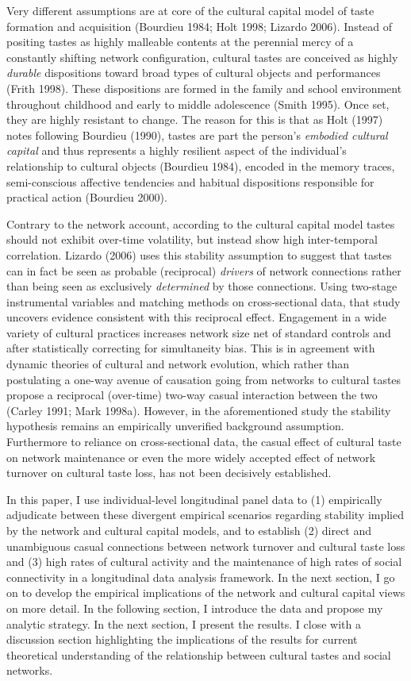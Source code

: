 \documentclass[
]{article}
\begin{document}
Very different assumptions are at core of the cultural capital model of taste formation and acquisition (Bourdieu 1984; Holt 1998; Lizardo 2006). Instead of positing tastes as highly malleable contents at the perennial mercy of a constantly shifting network configuration, cultural tastes are conceived as highly \emph{durable} dispositions toward broad types of cultural objects and performances (Frith 1998). These dispositions are formed in the family and school environment throughout childhood and early to middle adolescence (Smith 1995). Once set, they are highly resistant to change. The reason for this is that as Holt (1997) notes following Bourdieu (1990), tastes are part the person's \emph{embodied cultural capital} and thus represents a highly resilient aspect of the individual's relationship to cultural objects (Bourdieu 1984), encoded in the memory traces, semi-conscious affective tendencies and habitual dispositions responsible for practical action (Bourdieu 2000).

Contrary to the network account, according to the cultural capital model tastes should not exhibit over-time volatility, but instead show high inter-temporal correlation. Lizardo (2006) uses this stability assumption to suggest that tastes can in fact be seen as probable (reciprocal) \emph{drivers} of network connections rather than being seen as exclusively \emph{determined} by those connections. Using two-stage instrumental variables and matching methods on cross-sectional data, that study uncovers evidence consistent with this reciprocal effect. Engagement in a wide variety of cultural practices increases network size net of standard controls and after statistically correcting for simultaneity bias. This is in agreement with dynamic theories of cultural and network evolution, which rather than postulating a one-way avenue of causation going from networks to cultural tastes propose a reciprocal (over-time) two-way casual interaction between the two (Carley 1991; Mark 1998a). However, in the aforementioned study the stability hypothesis remains an empirically unverified background assumption. Furthermore to reliance on cross-sectional data, the casual effect of cultural taste on network maintenance or even the more widely accepted effect of network turnover on cultural taste loss, has not been decisively established.

In this paper, I use individual-level longitudinal panel data to (1) empirically adjudicate between these divergent empirical scenarios regarding stability implied by the network and cultural capital models, and to establish (2) direct and unambiguous casual connections between network turnover and cultural taste loss and (3) high rates of cultural activity and the maintenance of high rates of social connectivity in a longitudinal data analysis framework. In the next section, I go on to develop the empirical implications of the network and cultural capital views on more detail. In the following section, I introduce the data and propose my analytic strategy. In the next section, I present the results. I close with a discussion section highlighting the implications of the results for current theoretical understanding of the relationship between cultural tastes and social networks.
\end{document}
